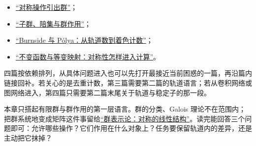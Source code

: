 \begin{itemize}
\tightlist
\item \hyperref[sec:04-Discrete-Mathematics/06-Groups-and-Symmetry/01]{``对称操作引出群''}；
\item \hyperref[sec:04-Discrete-Mathematics/06-Groups-and-Symmetry/02]{``子群、陪集与群作用''}；
\item \hyperref[sec:04-Discrete-Mathematics/06-Groups-and-Symmetry/03]{``Burnside 与 Pólya：从轨道数到着色计数''}；
\item \hyperref[sec:04-Discrete-Mathematics/06-Groups-and-Symmetry/04]{``不变函数与等变映射：对称性怎样进入计算''}。
\end{itemize}

四篇按依赖排列，从具体问题进入也可以先打开最接近当前困惑的一篇，再沿篇内链接回补。若关心的是去重计数，第三篇需要第二篇的轨道语言；若从卷积网络或图网络进入，第四篇只需要第二篇末尾关于轨道与稳定子的那一段。

本章只搭起有限群与群作用的第一层语言。群的分类、Galois 理论不在范围内；把群系统地变成矩阵这件事留给\hyperref[ch:035]{``群表示论：对称的线性结构''}。读完能回答三个问题即可：允许哪些操作？它们作用在什么对象上？任务要保留轨道内的差异，还是主动把它抹掉？
